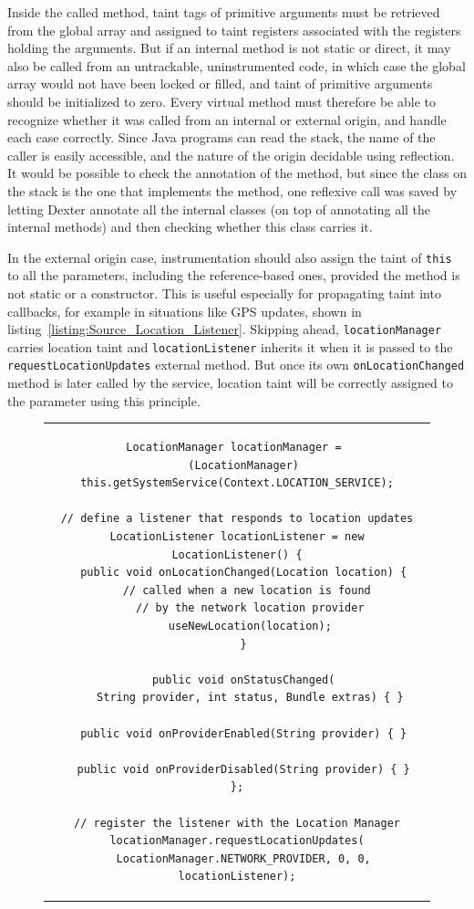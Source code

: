 \documentclass[12pt,twoside,notitlepage]{report}
\begin{document}
Inside the called method, taint tags of primitive arguments must be retrieved from the global array and assigned to taint registers associated with the registers holding the arguments. But if an internal method is not static or direct, it may also be called from an untrackable, uninstrumented code, in which case the global array would not have been locked or filled, and taint of primitive arguments should be initialized to zero. Every virtual method must therefore be able to recognize whether it was called from an internal or external origin, and handle each case correctly. Since Java programs can read the stack, the name of the caller is easily accessible, and the nature of the origin decidable using reflection. It would be possible to check the annotation of the method, but since the class on the stack is the one that implements the method, one reflexive call was saved by letting Dexter annotate all the internal classes (on top of annotating all the internal methods) and then checking whether this class carries it. 

In the external origin case, instrumentation should also assign the taint of \verb$this$ to all the parameters, including the reference-based ones, provided the method is not static or a constructor. This is useful especially for propagating taint into callbacks, for example in situations like GPS updates, shown in listing~\ref{listing:Source_Location_Listener}. Skipping ahead, \verb$locationManager$ carries location taint and \verb$locationListener$ inherits it when it is passed to the \verb$requestLocationUpdates$ external method. But once its own \verb$onLocationChanged$ method is later called by the service, location taint will be correctly assigned to the parameter using this principle. 

\begin{figure}
	\centering
	\begin{tabular}{c}
	\begin{lstlisting}
LocationManager locationManager = 
  (LocationManager) this.getSystemService(Context.LOCATION_SERVICE);

// define a listener that responds to location updates
LocationListener locationListener = new LocationListener() {
  public void onLocationChanged(Location location) {
    // called when a new location is found 
    // by the network location provider
    useNewLocation(location);
  }

  public void onStatusChanged(
    String provider, int status, Bundle extras) { }

  public void onProviderEnabled(String provider) { }

  public void onProviderDisabled(String provider) { }
};

// register the listener with the Location Manager
locationManager.requestLocationUpdates(
  LocationManager.NETWORK_PROVIDER, 0, 0, locationListener);
	\end{lstlisting}
	\end{tabular}
	\begin{lstlisting}[caption={Example of a location-updating callback class},
	                   label={listing:Source_Location_Listener}]
	\end{lstlisting}
\end{figure}
\end{document}
